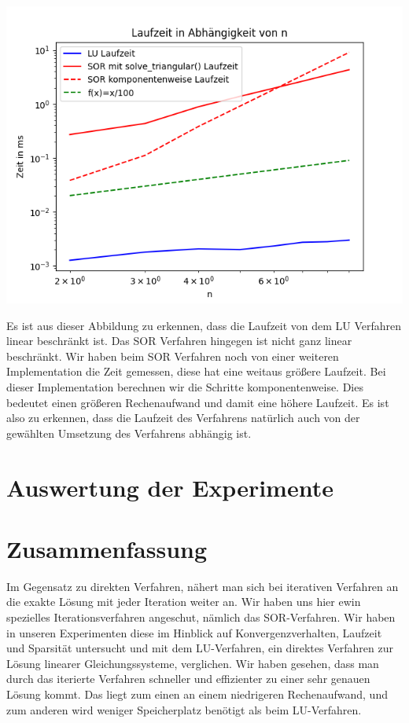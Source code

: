 \documentclass[smallheadings]{scrartcl}
\theoremstyle{definition}
\begin{document}
\begin{minipage}{\textwidth}

 \centering
 \includegraphics[scale = 0.9]{time1}
 	\label{time}

 \end{minipage}

Es ist aus dieser Abbildung zu erkennen, dass die Laufzeit von dem LU Verfahren linear beschränkt ist.  Das SOR Verfahren hingegen ist nicht ganz linear beschränkt.  Wir haben beim SOR Verfahren noch von einer weiteren Implementation die Zeit gemessen, diese hat eine weitaus größere Laufzeit. Bei dieser Implementation berechnen wir die Schritte komponentenweise. Dies bedeutet einen größeren Rechenaufwand und damit eine höhere Laufzeit. Es ist also zu erkennen, dass die Laufzeit des Verfahrens natürlich auch 
von der gewählten Umsetzung des Verfahrens abhängig ist. 

\section{Auswertung der Experimente}
\section{Zusammenfassung}

Im Gegensatz zu direkten Verfahren, nähert man sich bei iterativen Verfahren an die exakte Lösung mit jeder Iteration weiter an.  Wir haben uns hier ewin spezielles Iterationsverfahren angeschut, nämlich das SOR-Verfahren. Wir haben in unseren Experimenten diese im Hinblick auf Konvergenzverhalten, Laufzeit und Sparsität untersucht und mit dem LU-Verfahren, ein direktes Verfahren zur Lösung linearer Gleichungssysteme, verglichen.  Wir haben gesehen, dass man durch das iterierte Verfahren schneller und effizienter zu einer sehr genauen Lösung kommt.  Das liegt zum einen an einem niedrigeren Rechenaufwand, und zum anderen wird weniger Speicherplatz benötigt als beim LU-Verfahren. 
\end{document}
